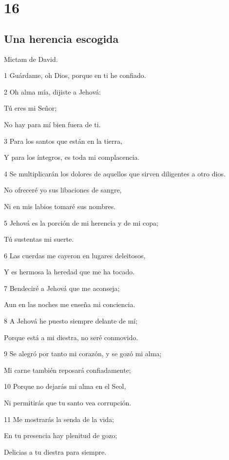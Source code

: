 \chapter{16}

\section*{Una herencia escogida}

\par Mictam de David.

\par 1 Guárdame, oh Dios, porque en ti he confiado.
\par 2 Oh alma mía, dijiste a Jehová:
\par Tú eres mi Señor;
\par No hay para mí bien fuera de ti.
\par 3 Para los santos que están en la tierra,
\par Y para los íntegros, es toda mi complacencia.
\par 4 Se multiplicarán los dolores de aquellos que sirven diligentes a otro dios.
\par No ofreceré yo sus libaciones de sangre,
\par Ni en mis labios tomaré sus nombres.
\par 5 Jehová es la porción de mi herencia y de mi copa;
\par Tú sustentas mi suerte.
\par 6 Las cuerdas me cayeron en lugares deleitosos,
\par Y es hermosa la heredad que me ha tocado.
\par 7 Bendeciré a Jehová que me aconseja;
\par Aun en las noches me enseña mi conciencia.
\par 8 A Jehová he puesto siempre delante de mí;
\par Porque está a mi diestra, no seré conmovido.
\par 9 Se alegró por tanto mi corazón, y se gozó mi alma;
\par Mi carne también reposará confiadamente;
\par 10 Porque no dejarás mi alma en el Seol,
\par Ni permitirás que tu santo vea corrupción.
\par 11 Me mostrarás la senda de la vida;
\par En tu presencia hay plenitud de gozo;
\par Delicias a tu diestra para siempre.

